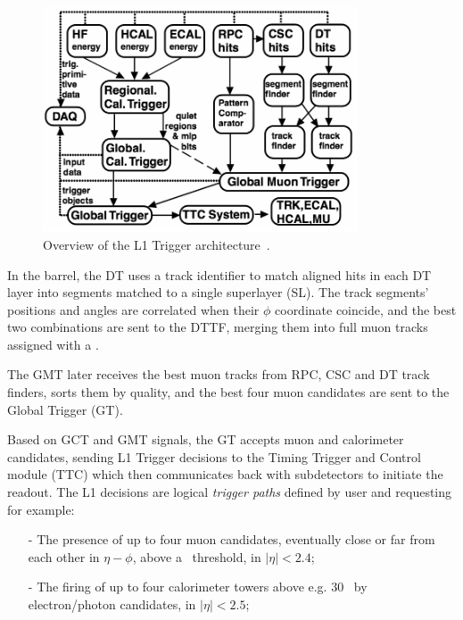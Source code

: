 \begin{figure}[h]
\begin{center}
\includegraphics[width=0.83\textwidth]{Chapters/xLHCMS/L1Trigger.png}
\caption{Overview of the L1 Trigger architecture~\cite{Dasu:2000ge}.} 
\label{fig:L1arch}
\end{center}
\end{figure}


In the barrel, the DT uses a track identifier to match aligned hits in
each DT layer into segments matched to a single superlayer (SL). The track segments' positions and angles
are correlated when their $\phi$ coordinate coincide, and the best two
combinations are sent to the DTTF, merging them into full muon tracks
assigned with a \pt.

The GMT later receives the best muon tracks from RPC, CSC and DT track finders, sorts them by quality, and the best four muon candidates are sent to the Global Trigger (GT).

Based on GCT and GMT signals, the GT accepts muon and calorimeter candidates, sending L1 Trigger decisions to the Timing Trigger
and Control module (TTC) which then communicates back with subdetectors to initiate the readout. The L1 decisions are
logical \textit{trigger paths} defined by user and requesting for example:
\begin{itemize}
\item[-] The presence of up to four muon candidates, eventually close or far from each other in $\eta-\phi$, above a
  \pt\ threshold, in $\vert\eta\vert < 2.4$;  %
\item[-] The firing of up to four calorimeter towers above e.g. 30 \GeV\ by electron/photon candidates, in
  $\vert\eta\vert < 2.5$;
\end{itemize}

